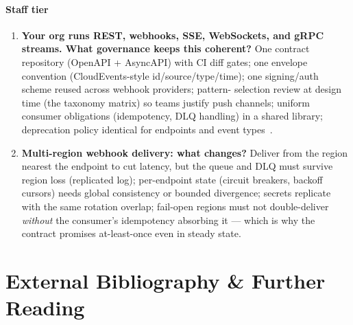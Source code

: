 \paragraph{Staff tier}

\begin{enumerate}[label=\textbf{Q\arabic*.}, leftmargin=1.6cm, start=33]
  \item \textbf{Your org runs REST, webhooks, SSE, WebSockets, and gRPC
        streams. What governance keeps this coherent?}
        One contract repository (OpenAPI + AsyncAPI) with CI diff gates;
        one envelope convention (CloudEvents-style id/source/type/time);
        one signing/auth scheme reused across webhook providers; pattern-
        selection review at design time (the taxonomy matrix) so teams
        justify push channels; uniform consumer obligations (idempotency,
        DLQ handling) in a shared library; deprecation policy identical for
        endpoints and event types~\cite{newman2021microservices,asyncapi}.
  \item \textbf{Multi-region webhook delivery: what changes?}
        Deliver from the region nearest the endpoint to cut latency, but the
        queue and DLQ must survive region loss (replicated log); per-endpoint
        state (circuit breakers, backoff cursors) needs global consistency or
        bounded divergence; secrets replicate with the same rotation overlap;
        fail-open regions must not double-deliver \emph{without} the
        consumer's idempotency absorbing it --- which is why the contract
        promises at-least-once even in steady state.
\end{enumerate}

\section{External Bibliography \& Further Reading}
\label{sec:ch11-further}

